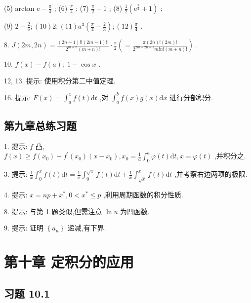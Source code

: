 (5) arctan \(\mathrm{e} - \frac{\pi }{4}\) ; (6) \(\frac{\pi }{4}\) ; (7) \(\frac{\pi }{2} - 1\) ; (8) \(\frac{1}{2}\left( {{\mathrm{e}}^{\frac{\pi }{2}} + 1}\right)\) ;

(9) \(2 - \frac{2}{\mathrm{e}};\left( {10}\right) 2;\left( {11}\right) {a}^{3}\left( {\frac{\pi }{4} - \frac{2}{3}}\right) ;\left( {12}\right) \frac{\pi }{4}\) .

8. \(J\left( {{2m},{2n}}\right)  = \frac{\left( {{2n} - 1}\right) !!\left( {{2m} - 1}\right) !!}{{2}^{m + n}\left( {m + n}\right) !} \cdot  \frac{\pi }{2}\left( { = \frac{\pi \left( {2n}\right) !\left( {2m}\right) !}{{2}^{{2m} + {2n} + 1}m!n!\left( {m + n}\right) !}}\right)\) .

10. \(f\left( x\right)  - f\left( a\right) ;\;1 - \cos x\) .

12, 13. 提示: 使用积分第二中值定理.

16. 提示: \(F\left( x\right)  = {\int }_{a}^{x}f\left( t\right) \mathrm{d}t\) ,对 \({\int }_{a}^{b}f\left( x\right) g\left( x\right) \mathrm{d}x\) 进行分部积分.

\subsection{第九章总练习题}

1. 提示: \(f\) 凸, \(f\left( x\right)  \geq  f\left( {x}_{0}\right)  + {f}^{\prime }\left( {x}_{0}\right) \left( {x - {x}_{0}}\right) ,{x}_{0} = \frac{1}{a}{\int }_{0}^{a}\varphi \left( t\right) \mathrm{d}t,x = \varphi \left( t\right)\) ,并积分之.

3. 提示: \(\frac{1}{x}{\int }_{0}^{x}f\left( t\right) \mathrm{d}t = \frac{1}{x}{\int }_{0}^{\sqrt{x}}f\left( t\right) \mathrm{d}t + \frac{1}{x}{\int }_{\sqrt{x}}^{x}f\left( t\right) \mathrm{d}t\) ,并考察右边两项的极限.

4. 提示: \(x = {np} + {x}^{ * },0 < {x}^{ * } \leq  p\) ,利用周期函数的积分性质.

8. 提示: 与第 1 题类似,但需注意 \(\ln u\) 为凹函数.

9. 提示: 证明 \(\left\{  {a}_{n}\right\}\) 递减,有下界.

\section{第十章 定积分的应用}

\subsection{习题 10.1}

